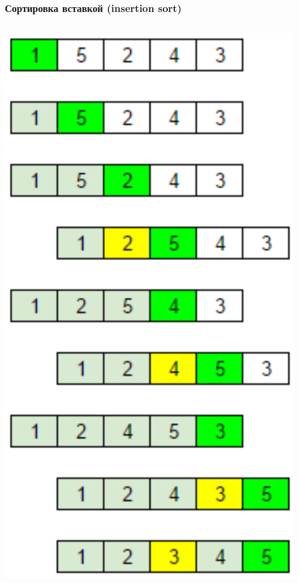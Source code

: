 \documentclass[xetex,mathserif,serif]{beamer}
\begin{document}
	\begin{frame}
		\frametitle{Сортировка вставкой (insertion sort)}
		\begin{columns}
			\begin{column}{0.25\textwidth}
				\includegraphics[width=\textwidth]{insertSort.png}
			\end{column}
			\begin{column}{0.75\textwidth}

\end{column}
\end{columns}
\end{frame}
\end{document}
